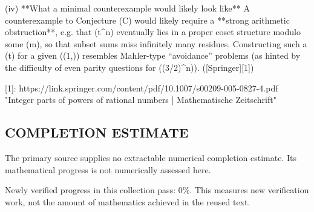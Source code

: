 (iv) **What a minimal counterexample would likely look like**
A counterexample to Conjecture (C) would likely require a **strong arithmetic obstruction**, e.g. that (\lfloor t\alpha^n\rfloor) eventually lies in a proper coset structure modulo some (m), so that subset sums miss infinitely many residues. Constructing such a (t) for a given (\alpha\in(1,\varphi)) resembles Mahler-type “avoidance” problems (as hinted by the difficulty of even parity questions for ((3/2)^n)). ([Springer][1])

[1]: https://link.springer.com/content/pdf/10.1007/s00209-005-0827-4.pdf "Integer parts of powers of rational numbers | Mathematische Zeitschrift"


\subsection*{COMPLETION ESTIMATE}
The primary source supplies no extractable numerical completion estimate. Its mathematical progress is not numerically assessed here.

Newly verified progress in this collection pass: $0\%$. This measures new verification work, not the amount of mathematics achieved in the reused text.

